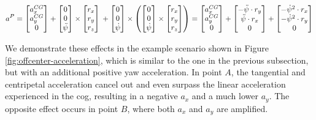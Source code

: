 \begin{equation}\label{eq:offcenter-acceleration-2d}%
a^P%
= \begin{bmatrix}a_x^{CG} \\ a_y^{CG} \\ 0\end{bmatrix}%
+ \begin{bmatrix}0 \\0 \\ \ddot{\psi}\end{bmatrix} \times \begin{bmatrix}r_x \\ r_y \\ r_z\end{bmatrix} \\%
+ \begin{bmatrix}0 \\ 0 \\ \dot{\psi}\end{bmatrix} \times \left(\begin{bmatrix}0 \\ 0 \\ \dot{\psi}\end{bmatrix} \times \begin{bmatrix}r_x \\ r_y \\ r_z\end{bmatrix}\right)%
= \begin{bmatrix}a_x^{CG} \\ a_y^{CG} \\ 0\end{bmatrix}%
+ \begin{bmatrix}-\ddot{\psi} \cdot r_y \\ \ddot{\psi} \cdot r_x \\ 0\end{bmatrix}%
+ \begin{bmatrix}-\dot{\psi}^2 \cdot r_x \\ -\dot{\psi}^2 \cdot r_y \\ 0\end{bmatrix}%
\end{equation}

We demonstrate these effects in the example scenario shown in Figure \ref{fig:offcenter-acceleration}, which is similar to the one in the previous subsection, but with an additional positive yaw acceleration. In point $A$, the tangential and centripetal acceleration cancel out and even surpass the linear acceleration experienced in the \gls{cog}, resulting in a negative $a_x$ and a much lower $a_y$. The opposite effect occurs in point $B$, where both $a_x$ and $a_y$ are amplified.


